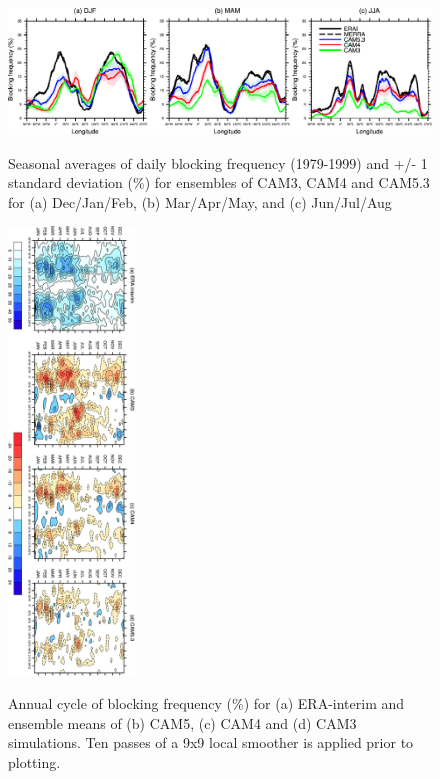 \documentclass[12pt,varwidth]{article}
\begin{document}
\begin{figure}[t]
  \begin{center}
    \noindent\includegraphics[width=1.0\textwidth,angle=0.]{./figs/f_bfreq.pdf}\\
  \end{center}
  \caption{Seasonal averages of daily blocking frequency (1979-1999) and +/- 1 standard deviation (\%) for ensembles of CAM3, CAM4 and CAM5.3 for (a) Dec/Jan/Feb, (b) Mar/Apr/May, and (c) Jun/Jul/Aug } 
\label{f_bfreq}
\end{figure}

\pagebreak

\begin{figure}[t]
  \begin{center}
    \noindent\includegraphics[width=0.3\textwidth,angle=90.]{./figs/f_acycle_block.pdf}\\
  \end{center}
  \caption{Annual cycle of blocking frequency (\%) for (a) ERA-interim and ensemble means of (b) CAM5, (c) CAM4 and (d) CAM3 simulations. Ten passes of a 9x9 local smoother is applied prior to plotting.}
\label{f_acycle_block}
\end{figure}
\end{document}
